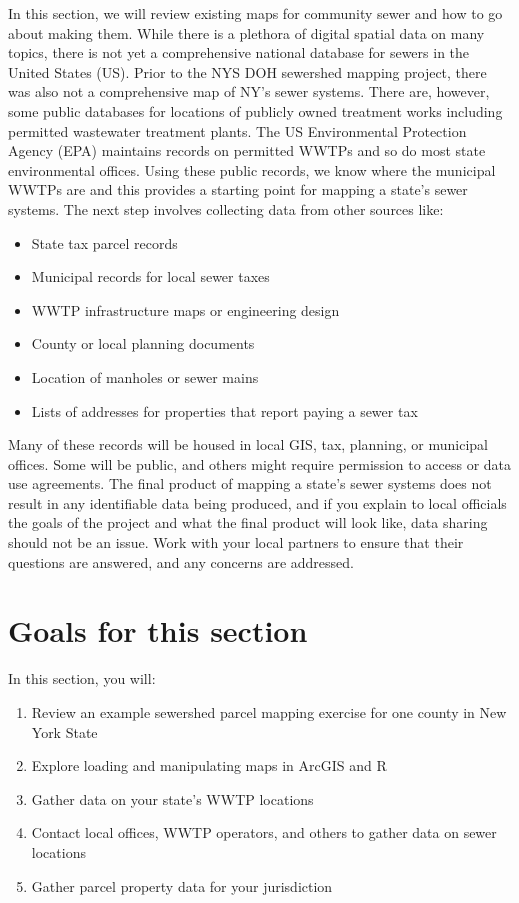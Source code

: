 \documentclass[
]{book}
\providecommand{\tightlist}{%
  \setlength{\itemsep}{0pt}\setlength{\parskip}{0pt}}
\begin{document}
In this section, we will review existing maps for community sewer and how to go about making them. While there is a plethora of digital spatial data on many topics, there is not yet a comprehensive national database for sewers in the United States (US). Prior to the NYS DOH sewershed mapping project, there was also not a comprehensive map of NY's sewer systems. There are, however, some public databases for locations of publicly owned treatment works including permitted wastewater treatment plants. The US Environmental Protection Agency (EPA) maintains records on permitted WWTPs and so do most state environmental offices. Using these public records, we know where the municipal WWTPs are and this provides a starting point for mapping a state's sewer systems. The next step involves collecting data from other sources like:

\begin{itemize}
\tightlist
\item
  State tax parcel records
\item
  Municipal records for local sewer taxes
\item
  WWTP infrastructure maps or engineering design
\item
  County or local planning documents
\item
  Location of manholes or sewer mains
\item
  Lists of addresses for properties that report paying a sewer tax
\end{itemize}

Many of these records will be housed in local GIS, tax, planning, or municipal offices. Some will be public, and others might require permission to access or data use agreements. The final product of mapping a state's sewer systems does not result in any identifiable data being produced, and if you explain to local officials the goals of the project and what the final product will look like, data sharing should not be an issue. Work with your local partners to ensure that their questions are answered, and any concerns are addressed.

\section{Goals for this section}\label{goals-for-this-section-1}

In this section, you will:

\begin{enumerate}
\def\labelenumi{\arabic{enumi}.}
\tightlist
\item
  Review an example sewershed parcel mapping exercise for one county in New York State
\item
  Explore loading and manipulating maps in ArcGIS and R
\item
  Gather data on your state's WWTP locations
\item
  Contact local offices, WWTP operators, and others to gather data on sewer locations
\item
  Gather parcel property data for your jurisdiction
\end{enumerate}
\end{document}
